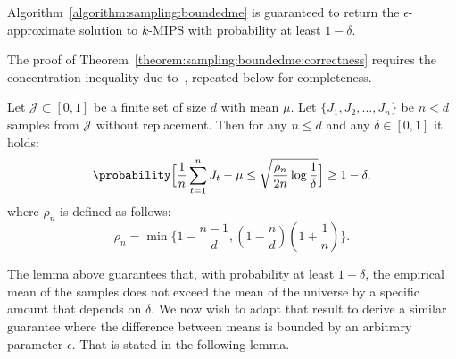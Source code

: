 \begin{theorem}
    \label{theorem:sampling:boundedme:correctness}
    Algorithm~\ref{algorithm:sampling:boundedme} is guaranteed to return the $\epsilon$-approximate
    solution to $k$-MIPS with probability at least $1 - \delta$.
\end{theorem}

The proof of Theorem~\ref{theorem:sampling:boundedme:correctness} requires the
concentration inequality due to~\cite{remi2015concentrationInequality}, repeated below
for completeness.

\begin{lemma}
    \label{lemma:sampling:concentration-inequality-sampling-wo-replacement}
    Let $\mathcal{J} \subset [0, 1]$ be a finite set of size $d$
    with mean $\mu$. Let $\{J_1, J_2, \ldots, J_n\}$ be $n < d$
    samples from $\mathcal{J}$ without replacement. Then for any $n \leq d$
    and any $\delta \in [0, 1]$ it holds:
    \begin{equation*}
        \probability\Big[
            \frac{1}{n} \sum_{t = 1}^n J_t - \mu \leq 
            \sqrt{\frac{\rho_n}{2n} \log \frac{1}{\delta}}
        \Big] \geq 1 - \delta,
    \end{equation*}
    where $\rho_n$ is defined as follows:
    \begin{equation*}
        \rho_n = \min \Big\{ 1 - \frac{n - 1}{d}, (1 - \frac{n}{d})(1 + \frac{1}{n}) \Big\}.
    \end{equation*}
\end{lemma}

The lemma above guarantees that, with probability at least $1 - \delta$,
the empirical mean of the samples does not exceed the mean of the universe
by a specific amount that depends on $\delta$. 
We now wish to adapt that result to derive a similar guarantee where the difference
between means is bounded by an arbitrary parameter $\epsilon$.
That is stated in the following lemma.

